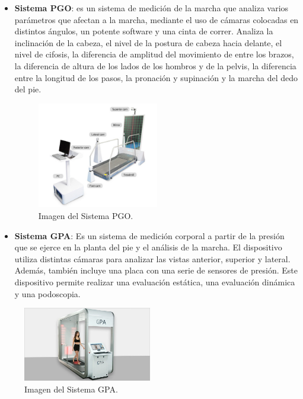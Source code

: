 \begin{itemize}
    \item \textbf{Sistema PGO}\cite{SisPGO}: es un sistema de medición de la marcha que analiza varios parámetros que afectan a la marcha, mediante el uso de cámaras colocadas en distintos ángulos, un potente software y una cinta de correr. Analiza la inclinación de la cabeza, el nivel de la postura de cabeza hacia delante, el nivel de cifosis, la diferencia de amplitud del movimiento de entre los brazos, la diferencia de altura de los lados de los hombros y de la pelvis, la diferencia entre la longitud de los pasos, la pronación y supinación y la marcha del dedo del pie. 
\begin{figure}[h!]
    \centering
    \includegraphics[width=0.5\textwidth]{img/imgPGO.jpg}
    \caption{Imagen del Sistema PGO. \cite{SisPGO}}
    \label{fig:imgPGO} 
\end{figure}
    \item \textbf{Sistema GPA}\cite{SisGPA}: Es un sistema de medición corporal a partir de la presión que se ejerce en la planta del pie y el análisis de la marcha. El dispositivo utiliza distintas cámaras para analizar las vistas anterior, superior y lateral. Además, también incluye una placa con una serie de sensores de presión. Este dispositivo permite realizar una evaluación estática, una evaluación dinámica y una podoscopia.  
\end{itemize}
\begin{figure}[h!]
    \centering
    \includegraphics[width=0.5\textwidth]{img/imgGPA.jpg}
    \caption{Imagen del Sistema GPA. \cite{SisGPA}}
    \label{fig:imgGPA} 
\end{figure}
